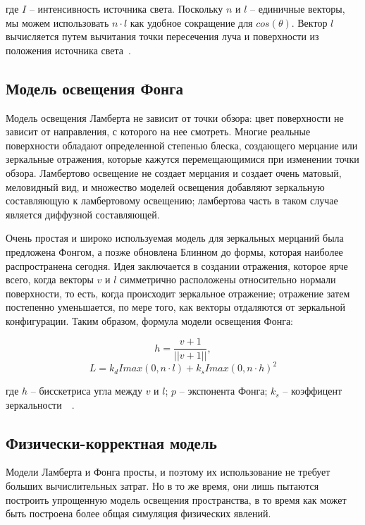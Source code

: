 где $I$ -- интенсивность источника света. Поскольку $n$ и $l$ -- единичные векторы, мы можем использовать $n \cdot l$ как удобное сокращение для $cos(\theta)$. 
Вектор $l$ вычисляется путем вычитания точки пересечения луча и поверхности из положения 
источника света~\cite{FoCG}.

\subsection{Модель освещения Фонга}
Модель освещения Ламберта не зависит от точки обзора: цвет поверхности не 
зависит от направления, с которого на нее смотреть. Многие реальные поверхности 
обладают определенной степенью блеска, создающего мерцание или зеркальные отражения, 
которые кажутся перемещающимися при изменении точки обзора. 
Ламбертово освещение не создает мерцания и создает очень матовый, 
меловидный вид, и множество моделей освещения добавляют зеркальную 
составляющую к ламбертовому освещению; ламбертова часть в таком случае 
является диффузной составляющей. 

Очень простая и широко используемая модель для зеркальных мерцаний была 
предложена Фонгом, а позже обновлена Блинном до 
формы, которая наиболее распространена сегодня. Идея заключается в создании 
отражения, которое ярче всего, когда векторы $v$ и $l$ симметрично расположены 
относительно нормали поверхности, то есть, когда происходит зеркальное 
отражение; отражение затем постепенно уменьшается, по мере того, 
как векторы отдаляются от зеркальной конфигурации. Таким образом, формула модели
освещения Фонга:

\begin{equation}
    h = \frac{v + 1}{||v+1||},
\end{equation}
\begin{equation}
    L = k_d I max(0, n \cdot l) + k_s I max(0, n \cdot  h)^2
\end{equation}

где $h$ -- бисскетриса угла между $v$ и $l$; $p$ -- экспонента Фонга; $k_s$ -- коэффицент зеркальности~\cite{IFCGP}~\cite{FoCG}.

\subsection{Физически-корректная модель}

Модели Ламберта и Фонга просты, и поэтому их использование не требует больших вычислительных
затрат. Но в то же время, они лишь пытаются построить упрощенную модель освещения пространства, в то время как может быть построена более общая симуляция физических явлений.

